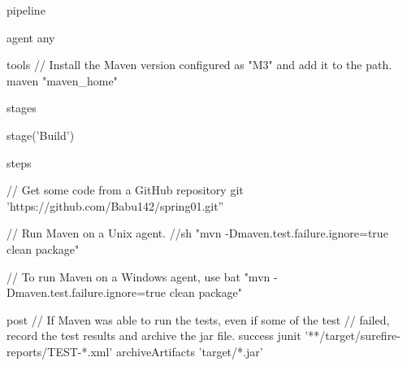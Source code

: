 pipeline {
    agent any

    tools {
        // Install the Maven version configured as "M3" and add it to the path.
        maven "maven_home"
    }

    stages {
        stage('Build') {
            steps {
                // Get some code from a GitHub repository
                git 'https://github.com/Babu142/spring01.git''

                // Run Maven on a Unix agent.
                //sh "mvn -Dmaven.test.failure.ignore=true clean package"

                // To run Maven on a Windows agent, use
                 bat "mvn -Dmaven.test.failure.ignore=true clean package"
            }

            post {
                // If Maven was able to run the tests, even if some of the test
                // failed, record the test results and archive the jar file.
                success {
                    junit '**/target/surefire-reports/TEST-*.xml'
                    archiveArtifacts 'target/*.jar'
                }
            }
        }
    }
}
